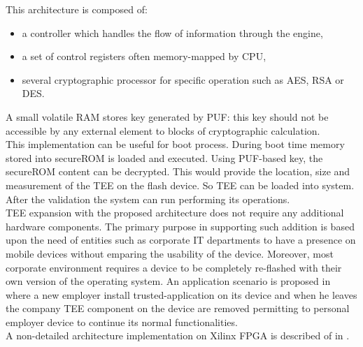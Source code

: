 \documentclass[../tesi.tex]{subfiles}
\begin{document}
{This architecture is composed of:
\begin{itemize}
\item a controller which handles the flow of information through the engine,
\item a set of control registers often memory-mapped by CPU,
\item several cryptographic processor for specific operation such as AES, RSA or DES.
\end{itemize}
A small volatile RAM stores key generated by PUF: this key should not be accessible by any external element to blocks of cryptographic calculation. \\
This implementation can be useful for boot process. During boot time memory stored into secureROM is loaded and executed. Using PUF-based key, the secureROM content can be decrypted. This would provide the location, size and measurement of the TEE on the flash device. So TEE can be loaded into system. After the validation the system can run performing its operations. \\
TEE expansion with the proposed architecture does not require any additional hardware components. The primary purpose in supporting such addition is based upon the need of entities such as corporate IT departments to have a presence on mobile devices without emparing the usability of the device. Moreover, most corporate environment requires a device to be completely re-flashed  with their own version of the operating system. An application scenario is proposed in  \cite{areno2012securing} where a new employer install trusted-application on its device and when he leaves the company TEE component on the device are removed permitting to personal employer device to continue its normal functionalities. \\
A non-detailed architecture implementation on Xilinx FPGA is described of in \cite{areno2012securing}.


 

}
\end{document}
